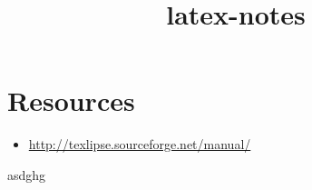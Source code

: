 \documentclass{report}
\title{latex-notes}
\begin{document}
\tableofcontents




\part{Resources}
\begin{itemize}
  \item \url{http://texlipse.sourceforge.net/manual/}
  \end{itemize}
  asdghg
\end{document}
